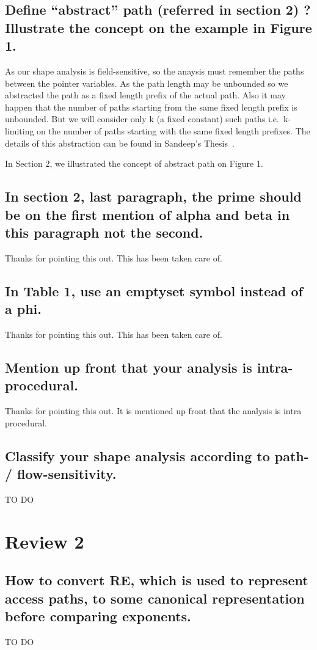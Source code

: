 \documentclass{IOS-Book-Article}
\begin{document}
\subsection{Define ``abstract'' path (referred in section 2)
  ? Illustrate the concept on the example in Figure 1.} 
As our shape analysis is field-sensitive, so the anaysis must
remember the paths between the pointer variables. As the path
length may be unbounded so we abstracted the path as a fixed
length prefix of the actual path. Also it may happen that the
number of paths starting from the same fixed length prefix is
unbounded. But we will consider only k (a fixed constant)
such paths i.e.\ k-limiting on the number of paths starting
with the same fixed length prefixes. The details of this
abstraction can be found in Sandeep's
Thesis~\cite{Sandeep11thesis}.

In Section 2, we illustrated the concept of abstract path on
Figure 1.

\subsection{In section 2, last paragraph, the prime should be
  on the first mention of  alpha and beta in this paragraph
  not the second.} 
Thanks for pointing this out. This has been taken care of.

\subsection{In Table 1, use an emptyset symbol instead of a phi.}
Thanks for pointing this out. This has been taken care of.

\subsection{Mention up front that your analysis is intra-procedural.}
Thanks for pointing this out. It is mentioned up front that
the analysis is intra procedural.  

\subsection{Classify your shape analysis according to path- /
  flow-sensitivity.} 
{\red TO DO}


\section{Review 2}
\subsection{How to convert RE, which is used to represent
  access paths, to some canonical representation before
  comparing exponents.} 
{\red TO DO}
\end{document}

